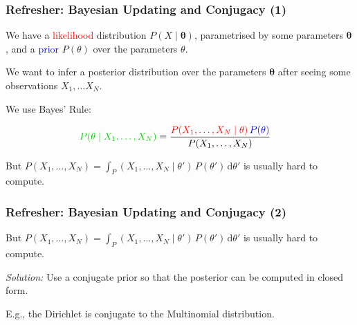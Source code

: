 \documentclass[12pt]{beamer}
\newcommand{\red}[1]{\textcolor{red}{#1}}
\newcommand{\green}[1]{\textcolor{black!20!green}{#1}}
\newcommand{\blue}[1]{\textcolor{blue}{#1}}
\begin{document}
\begin{frame}
    \frametitle{Refresher: Bayesian Updating and Conjugacy (1)}

    We have a 
    \red{likelihood} 
    distribution $P(X \mid \mathbf{\theta})$, 
    parametrised by some parameters $\mathbf{\theta}$, and a 
    \blue{prior} $P(\theta)$ over the parameters $\theta$.

    \bigskip

    We want to infer a \green{posterior}
    distribution over the parameters $\mathbf{\theta}$ 
    after seeing some observations $X_1, \dots X_N$. 

    \bigskip

    We use Bayes' Rule:

    \begin{align*}
        \green{P(\theta \mid X_1, \dots, X_N)}
        &= \frac{
            \red{P(X_1, \dots, X_N \mid \theta)}
            \, 
            \blue{P(\theta)}
        }
        {
            P(X_1, \dots, X_N)
        }
    \end{align*}

    \bigskip

    \pause

    But
    $P(X_1, \dots, X_N) = \int_ P(X_1, \dots, X_N \mid \theta')\, P(\theta')
    \,\mathrm{d}\theta'$
    is usually hard to compute.

\end{frame}


\begin{frame}
    \frametitle{Refresher: Bayesian Updating and Conjugacy (2)}

    \begin{mdframed}[tikzsetting={draw=red,ultra thick}]
        But
        $P(X_1, \dots, X_N) = \int_ P(X_1, \dots, X_N \mid \theta')\, P(\theta')
        \,\mathrm{d}\theta'$
        is usually hard to compute.
    \end{mdframed}

    \bigskip

    \emph{Solution:} 
    Use a \alert{conjugate} prior so that the posterior
    can be computed in closed form.

    \bigskip

    E.g., the Dirichlet is conjugate to the \alert{Multinomial} distribution.

\end{frame}
\end{document}
